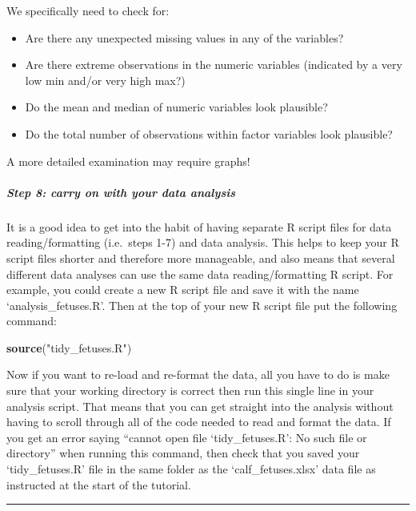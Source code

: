 \documentclass[
]{article}
\newenvironment{Shaded}{\begin{snugshade}}{\end{snugshade}}
\newcommand{\KeywordTok}[1]{\textcolor[rgb]{0.13,0.29,0.53}{\textbf{#1}}}
\newcommand{\NormalTok}[1]{#1}
\newcommand{\StringTok}[1]{\textcolor[rgb]{0.31,0.60,0.02}{#1}}
\begin{document}
We specifically need to check for:

\begin{itemize}
\item
  Are there any unexpected missing values in any of the variables?
\item
  Are there extreme observations in the numeric variables (indicated by
  a very low min and/or very high max?)
\item
  Do the mean and median of numeric variables look plausible?
\item
  Do the total number of observations within factor variables look
  plausible?
\end{itemize}

A more detailed examination may require graphs!

\hypertarget{step-8-carry-on-with-your-data-analysis}{%
\subparagraph{Step 8: carry on with your data
analysis}\label{step-8-carry-on-with-your-data-analysis}}

It is a good idea to get into the habit of having separate R script
files for data reading/formatting (i.e.~steps 1-7) and data analysis.
This helps to keep your R script files shorter and therefore more
manageable, and also means that several different data analyses can use
the same data reading/formatting R script. For example, you could create
a new R script file and save it with the name `analysis\_fetuses.R'.
Then at the top of your new R script file put the following command:

\begin{Shaded}
\begin{Highlighting}[]
\KeywordTok{source}\NormalTok{(}\StringTok{"tidy_fetuses.R"}\NormalTok{)}
\end{Highlighting}
\end{Shaded}

Now if you want to re-load and re-format the data, all you have to do is
make sure that your working directory is correct then run this single
line in your analysis script. That means that you can get straight into
the analysis without having to scroll through all of the code needed to
read and format the data. If you get an error saying ``cannot open file
`tidy\_fetuses.R': No such file or directory'' when running this
command, then check that you saved your `tidy\_fetuses.R' file in the
same folder as the `calf\_fetuses.xlsx' data file as instructed at the
start of the tutorial.

\begin{center}\rule{0.5\linewidth}{0.5pt}\end{center}
\end{document}
